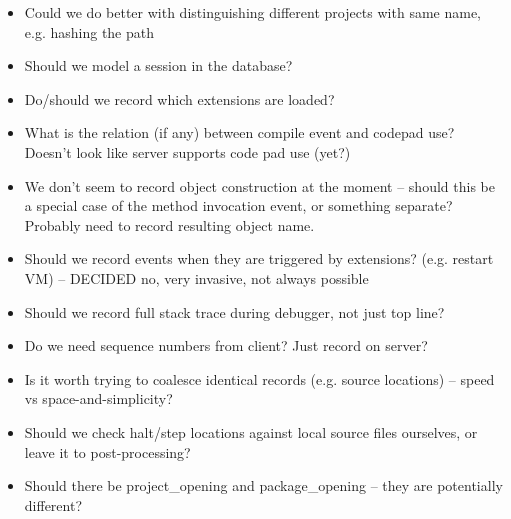 \documentclass{book}
\begin{document}
\begin{itemize}
\item Could we do better with distinguishing different projects with same
  name, e.g. hashing the path
\item Should we model a session in the database?
\item Do/should we record which extensions are loaded?
\item What is the relation (if any) between compile event and codepad use?
  Doesn't look like server supports code pad use (yet?)
\item We don't seem to record object construction at the moment -- should this be a
  special case of the method invocation event, or something separate?
  Probably need to record resulting object name.
\item Should we record events when they are triggered by extensions?
  (e.g. restart VM) -- DECIDED no, very invasive, not always possible
\item Should we record full stack trace during debugger, not just top line?
\item Do we need sequence numbers from client?  Just record on server?
\item Is it worth trying to coalesce identical records (e.g. source locations)
  -- speed vs space-and-simplicity?
\item Should we check halt/step locations against local source files
  ourselves, or leave it to post-processing?
\item Should there be project_opening and package_opening -- they are potentially
different?
\end{itemize}
\end{document}
